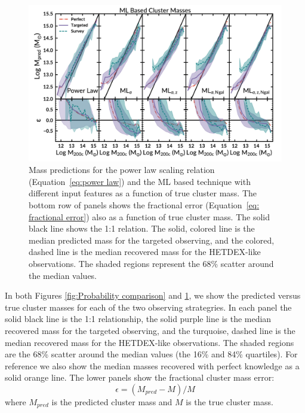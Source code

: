 \documentclass[fleqn,usenatbib]{mnras}
\begin{document}
\begin{figure} 
	\includegraphics[width=\textwidth]{figures/MLcomparison.pdf} 
	\caption{Mass predictions for the power law scaling relation (Equation~\ref{eq:power law}) and the ML based technique with different input features as a function of true cluster mass. The bottom row of panels shows the fractional error (Equation~\ref{eq: fractional error}) also as a function of true cluster mass. The solid black line shows the 1:1 relation. The solid, colored line is the median predicted mass for the targeted observing, and the colored, dashed line is the median recovered mass for the HETDEX-like observations. The shaded regions represent the 68\% scatter around the median values.} \label{fig: ML comparison} 
\end{figure}

In both Figures \ref{fig:Probability comparison} and \ref{fig: ML comparison}, we show the predicted versus true cluster masses for each of the two observing strategries. In each panel the solid black line is the 1:1 relationship, the solid purple line is the median recovered mass for the targeted observing, and the turquoise, dashed line is the median recovered mass for the HETDEX-like observations. The shaded regions are the 68\% scatter around the median values (the 16\% and 84\% quartiles). For reference we also show the median masses recovered with perfect knowledge as a solid orange line. The lower panels show the fractional cluster mass error: 
\begin{equation}\label{eq: fractional error}
	\epsilon = (M_{pred} - M)/M
\end{equation}
where $M_{pred}$ is the predicted cluster mass and $M$ is the true cluster mass.
\end{document}
